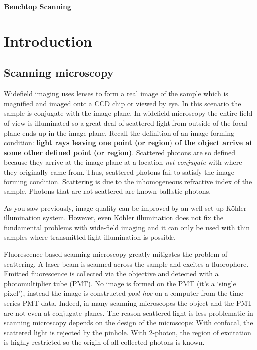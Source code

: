 \documentclass[a4paper]{report}
\begin{document}
\setcounter{secnumdepth}{2}

\begin{center}
\textbf{\Large{Benchtop Scanning}}
\end{center}

\section{Introduction}

\subsection{Scanning microscopy}
Widefield imaging uses lenses to form a real image of the sample which is magnified and imaged onto a CCD chip or viewed by eye. 
In this scenario the sample is conjugate with the image plane. 
In widefield microscopy the entire field of view is illuminated so a great deal of scattered light from outside of the focal plane ends up in the image plane. 
Recall the definition of an image-forming condition: \textbf{light rays leaving one point (or region) of the object arrive at some other defined point (or region)}.
Scattered photons are so defined because they arrive at the image plane at a location \textit{not conjugate} with where they originally came from.
Thus, scattered photons fail to satisfy the image-forming condition. 
Scattering is due to the inhomogeneous refractive index of the sample. 
Photons that are not scattered are known ballistic photons. 

As you saw previously, image quality can be improved by an well set up K\"{o}hler illumination system.
However, even K\"{o}hler illumination does not fix the fundamental problems with wide-field imaging and it can only be used with thin samples where transmitted light illumination is possible.

Fluorescence-based scanning microscopy greatly mitigates the problem of scattering. 
A laser beam is scanned across the sample and excites a fluorophore. 
Emitted fluorescence is collected via the objective and detected with a photomultiplier tube (PMT). 
No image is formed on the PMT (it's a `single pixel'), instead the image is constructed \textit{post-hoc} on a computer from the time-series PMT data.
Indeed, in many scanning microscopes the object and the PMT are not even at conjugate planes.
The reason scattered light is less problematic in scanning microscopy depends on the design of the microscope:
With confocal, the scattered light is rejected by the pinhole. 
With 2-photon, the region of excitation is highly restricted so the origin of all collected photons is known. 
\end{document}
